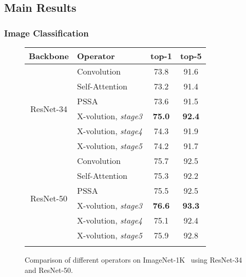 \documentclass{article}
\begin{document}
\vspace{-1mm}
\subsection{Main Results}

\subsubsection{Image Classification}

\begin{figure}[t]
    \centering
    \small
    \begin{minipage}[t!]{0.47\textwidth}
        \centering
\makeatletter{}\makeatother
        \caption{Comparison of different operators on ImageNet-1K~\cite{DBLP:conf/cvpr/DengDSLL009} using ResNet-34 and ResNet-50.
}
        \begin{spacing}{1.05}
         \small
\setlength\tabcolsep{4.5pt}
                \begin{tabular}{c| l| c| c}
                \Xhline{1.0pt}
        		Backbone &  Operator & top-1 & top-5
        		\\ \hline
        		
        		\multirow{6}{*}{ResNet-34} 
        		& Convolution & 73.8 & 91.6\\ 
                & Self-Attention & 73.2 & 91.4 \\
                & PSSA & 73.6 & 91.5 \\
                \cline{2-4}
        		& X-volution, \textit{stage3} & \textbf{75.0} & \textbf{92.4}  \\
        		& X-volution, \textit{stage4} & 74.3 & 91.9 \\
        		& X-volution, \textit{stage5} & 74.2 & 91.7 \\
        		\hline
        		
        		\multirow{6}{*}{ResNet-50} 
        		& Convolution & 75.7 & 92.5 \\ 
                & Self-Attention & 75.3 & 92.2\\
                & PSSA & 75.5 & 92.5 \\
                \cline{2-4}
        		& X-volution, \textit{stage3} & \textbf{76.6} & \textbf{93.3}\\
        		& X-volution, \textit{stage4} & 75.1 & 92.4\\
        		& X-volution, \textit{stage5} & 75.9 & 92.8\\
                \Xhline{1.0pt}
        \end{tabular}
        

\end{spacing}
\end{minipage}
\end{figure}
\end{document}
